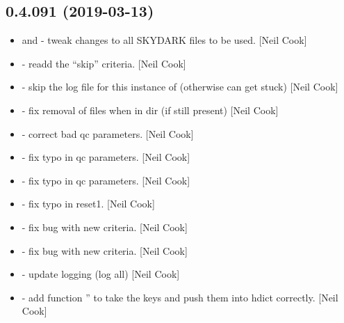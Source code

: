 \documentclass[a4paper,10pt,english]{report}
\begin{document}
\subsection{0.4.091 (2019-03-13)}
\label{\detokenize{misc/changelog:id169}}\begin{itemize}
\item {} 
 and  - tweak changes to all SKYDARK
files to be used. {[}Neil Cook{]}

\item {} 
 - readd the “skip” criteria. {[}Neil Cook{]}

\item {} 
 - skip the log file for this instance of 
(otherwise can get stuck) {[}Neil Cook{]}

\item {} 
 - fix removal of files when in dir (if still present)
{[}Neil Cook{]}

\item {} 
 - correct bad qc parameters. {[}Neil Cook{]}

\item {} 
 - fix typo in qc parameters. {[}Neil Cook{]}

\item {} 
 - fix typo in qc parameters. {[}Neil Cook{]}

\item {} 
 - fix typo in reset1. {[}Neil Cook{]}

\item {} 
 - fix bug with new  criteria. {[}Neil
Cook{]}

\item {} 
 - fix bug with new  criteria. {[}Neil
Cook{]}

\item {} 
 - update logging (log all) {[}Neil Cook{]}

\item {} 
 - add function ” to take the keys and push
them into hdict correctly. {[}Neil Cook{]}


\end{itemize}
\end{document}

